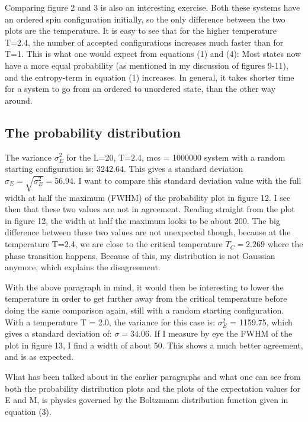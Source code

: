 \documentclass[twocolumn]{article}
\begin{document}
Comparing figure 2 and 3 is also an interesting exercise. Both these systems have an ordered spin configuration initially, so the only difference between the two plots are the temperature. It is easy to see that for the higher temperature T=2.4, the number of accepted configurations increases much faster than for T=1. This is what one would expect from equations (1) and (4):
Most states now have a more equal probability (as mentioned in my discussion of figures 9-11), and the entropy-term in equation (1) increases.\newline
In general, it takes shorter time for a system to go from an ordered to unordered state, than the other way around.\newline

\subsection{The probability distribution}

The variance $\sigma_E^2$ for the L=20, T=2.4, mcs = 1000000 system with a random starting configuration is: 3242.64. This gives a standard deviation $\sigma_E = \sqrt{\sigma_E^2} = 56.94$. I want to compare this standard deviation value with the full width at half the maximum (FWHM) of the probability plot  in figure 12. I see then that these two values are not in agreement. Reading straight from the plot in figure 12, the width at half the maximum looks to be about 200.\newline
The big difference between these two values are not unexpected though, because at the temperature T=2.4, we are close to the critical temperature $T_C = 2.269$ where the phase transition happens. Because of this, my distribution is not Gaussian anymore, which explains the disagreement.\newline

With the above paragraph in mind, it would then be interesting to lower the temperature in order to get further away from the critical temperature before doing the same comparison again, still with a random starting configuration.\newline
With a temperature T = 2.0, the variance for this case is: $\sigma_E^2$ = 1159.75, which gives a standard deviation of: $\sigma = 34.06$. If I measure by eye the FWHM of the plot in figure 13, I find a width of about 50. This shows a much better agreement, and is as expected.\newline

What has been talked about in the earlier paragraphs and what one can see from both the probability distribution plots and the plots of the expectation values for E and M, is physics governed by the Boltzmann distribution function given in equation (3).\newline
\end{document}
